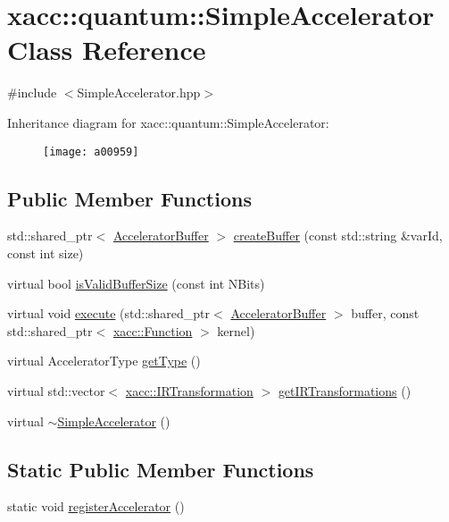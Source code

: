 \hypertarget{a00959}{}\section{xacc\+:\+:quantum\+:\+:Simple\+Accelerator Class Reference}
\label{a00959}


{\ttfamily \#include $<$Simple\+Accelerator.\+hpp$>$}

Inheritance diagram for xacc\+:\+:quantum\+:\+:Simple\+Accelerator\+:\begin{figure}[H]
\begin{center}
\leavevmode
\texttt{[image: a00959]}
\end{center}
\end{figure}
\subsection*{Public Member Functions}
\begin{DoxyCompactItemize}
\item 
std\+::shared\+\_\+ptr$<$ \hyperlink{a01123}{Accelerator\+Buffer} $>$ \hyperlink{a00959_adb9393692e9f484df241aa5d014030d1}{create\+Buffer} (const std\+::string \&var\+Id, const int size)
\item 
virtual bool \hyperlink{a00959_a60b9db2d6aed235857c45413a070338e}{is\+Valid\+Buffer\+Size} (const int N\+Bits)
\item 
virtual void \hyperlink{a00959_a3089b15fbbaa83abf2941bd3b8d2d3c6}{execute} (std\+::shared\+\_\+ptr$<$ \hyperlink{a01123}{Accelerator\+Buffer} $>$ buffer, const std\+::shared\+\_\+ptr$<$ \hyperlink{a01151}{xacc\+::\+Function} $>$ kernel)
\item 
virtual Accelerator\+Type \hyperlink{a00959_ad76eeb0bbd7de21aad5bd20d20970a98}{get\+Type} ()
\item 
virtual std\+::vector$<$ \hyperlink{a01179}{xacc\+::\+I\+R\+Transformation} $>$ \hyperlink{a00959_afc49c9e7973ba6c6ff9761c36198323d}{get\+I\+R\+Transformations} ()
\item 
virtual \hyperlink{a00959_a7ff286def924fafdff2066d12858e60c}{$\sim$\+Simple\+Accelerator} ()
\end{DoxyCompactItemize}
\subsection*{Static Public Member Functions}
\begin{DoxyCompactItemize}
\item 
static void \hyperlink{a00959_a1cfa3381a56ca6f431b4722162ccb63d}{register\+Accelerator} ()
\end{DoxyCompactItemize}
